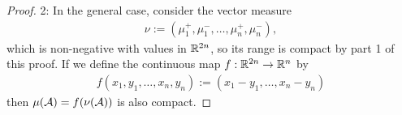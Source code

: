 \documentclass[../../main.tex]{subfiles}
\begin{document}
\begin{proof}
2: In the general case, consider the vector measure
\begin{align*}
	\nu:=(\mu_{1}^{+}, \mu_{1}^{-}, \dots, \mu_{n}^{+}, \mu_{n}^{-}),
\end{align*}
which is non-negative with values in $\mathbb{R}^{2n}$, so its range is compact by part 1 of this proof. If we define the continuous map $f:\mathbb{R}^{2n}\to \mathbb{R}^{n}$ by
\begin{align*}
	f(x_{1},y_{1}, \dots, x_{n},y_{n}):=(x_{1}-y_{1}, \dots, x_{n}-y_{n})
\end{align*}
then $\mu(\mathcal{A})=f(\nu(\mathcal{A}))$ is also compact.
\end{proof}
\end{document}
